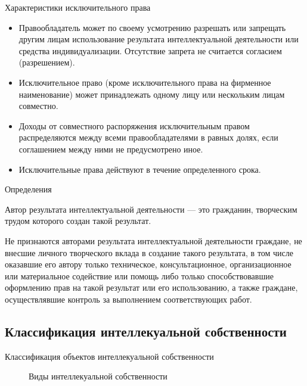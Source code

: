 \documentclass[_Venture_p2.tex]{subfiles}
\begin{document}
\begin{frame}[shrink=20]{Характеристики исключительного права}
\begin{itemize}
\item Правообладатель может по своему усмотрению разрешать или запрещать другим лицам использование результата интеллектуальной деятельности или средства индивидуализации. Отсутствие запрета не считается согласием (разрешением).

\item Исключительное право (кроме исключительного права на фирменное наименование) может принадлежать одному лицу или нескольким лицам совместно.

\item 	Доходы от совместного распоряжения исключительным правом распределяются между всеми правообладателями в равных долях, если соглашением между ними не предусмотрено иное.

\item Исключительные права действуют в течение определенного срока.
\end{itemize}
\end{frame}

\begin{frame}[shrink=15]{Определения}
\begin{block}{Автор результата интеллектуальной деятельности }
\quad
— это гражданин, творческим трудом которого создан такой результат.

Не признаются авторами результата интеллектуальной деятельности граждане, не внесшие личного творческого вклада в создание такого результата, в том числе оказавшие его автору только техническое, консультационное, организационное или материальное содействие или помощь либо только способствовавшие оформлению прав на такой результат или его использованию, а также граждане, осуществлявшие контроль за выполнением соответствующих работ.
\end{block}
\end{frame}
\subsection{Классификация интеллекуальной собственности}
\begin{frame}{Классификация объектов интеллекуальной собственности}
\begin{figure}
	\centering
	\begin{overprint}
	\end{overprint}
	\vspace*{-1.5cm}
	\caption{Виды интеллекуальной собственности}
\end{figure}
\end{frame}
\end{document}
